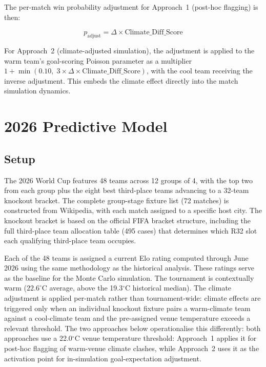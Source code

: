 \documentclass[11pt,a4paper]{article}
\begin{document}
The per-match win probability adjustment for Approach~1 (post-hoc flagging) is then:

\begin{equation}
    p_{\text{adjust}} = \Delta \times \text{Climate\_Diff\_Score}
\end{equation}

For Approach~2 (climate-adjusted simulation), the adjustment is applied to the warm team's goal-scoring Poisson parameter as a multiplier $1 + \min(0.10,\; 3 \times \Delta \times \text{Climate\_Diff\_Score})$, with the cool team receiving the inverse adjustment. This embeds the climate effect directly into the match simulation dynamics.

\newpage

\section{2026 Predictive Model}

\subsection{Setup}

The 2026 World Cup features 48 teams across 12 groups of 4, with the top two from each group plus the eight best third-place teams advancing to a 32-team knockout bracket. The complete group-stage fixture list (72 matches) is constructed from Wikipedia, with each match assigned to a specific host city. The knockout bracket is based on the official FIFA bracket structure, including the full third-place team allocation table (495 cases) that determines which R32 slot each qualifying third-place team occupies.

Each of the 48 teams is assigned a current Elo rating computed through June 2026 using the same methodology as the historical analysis. These ratings serve as the baseline for the Monte Carlo simulation. The tournament is contextually warm ($22.6^{\circ}$C average, above the 19.3$^{\circ}$C historical median). The climate adjustment is applied per-match rather than tournament-wide: climate effects are triggered only when an individual knockout fixture pairs a warm-climate team against a cool-climate team and the pre-assigned venue temperature exceeds a relevant threshold. The two approaches below operationalise this differently: both approaches use a 22.0$^{\circ}$C venue temperature threshold: Approach~1 applies it for post-hoc flagging of warm-venue climate clashes, while Approach~2 uses it as the activation point for in-simulation goal-expectation adjustment.
\end{document}
